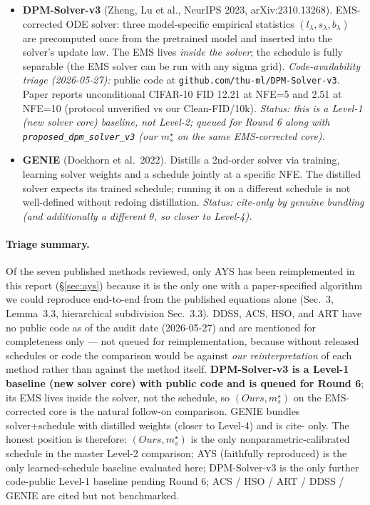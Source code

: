 \documentclass[11pt]{article}
\begin{document}
\begin{itemize}
  Timestep Schedule''). Adaptive Reparameterized Time + continuous-time
  RL with Gaussian policies; transfers from CIFAR-10 to FFHQ/AFHQv2/
  ImageNet without retraining. ``Within the official EDM pipeline''
  --- likely Heun-class--bound. \emph{Code-availability triage
  (2026-05-27):} no public GitHub released; arXiv'd 2026-01-26 (very
  recent). \emph{Status: no public code, mentioned for completeness.}
\item \textbf{DPM-Solver-v3} (Zheng, Lu et al., NeurIPS 2023,
  arXiv:2310.13268). EMS-corrected ODE solver: three model-specific
  empirical statistics \((l_\lambda, s_\lambda, b_\lambda)\) are
  precomputed once from the pretrained model and inserted into the
  solver's update law. The EMS lives \emph{inside the solver}; the
  schedule is fully separable (the EMS solver can be run with any
  sigma grid). \emph{Code-availability triage (2026-05-27):} public
  code at \texttt{github.com/thu-ml/DPM-Solver-v3}. Paper reports
  unconditional CIFAR-10 FID 12.21 at NFE=5 and 2.51 at NFE=10
  (protocol unverified vs our Clean-FID/10k). \emph{Status: this is
  a Level-1 (new solver core) baseline, not Level-2; queued for
  Round 6 along with \texttt{proposed\_dpm\_solver\_v3} (our
  \(m_s^\star\) on the same EMS-corrected core).}
\item \textbf{GENIE} (Dockhorn et al.\ 2022). Distills a 2nd-order
  solver via training, learning solver weights and a schedule jointly
  at a specific NFE. The distilled solver expects its trained schedule;
  running it on a different schedule is not well-defined without
  redoing distillation. \emph{Status: cite-only by genuine bundling
  (and additionally a different \(\theta\), so closer to Level-4).}
\end{itemize}

\paragraph{Triage summary.} Of the seven published methods reviewed,
only AYS has been reimplemented in this report (\S\ref{sec:ays})
because it is the only one with a paper-specified algorithm we could
reproduce end-to-end from the published equations alone (Sec.~3,
Lemma~3.3, hierarchical subdivision Sec.~3.3). DDSS, ACS, HSO, and ART
have no public code as of the audit date (2026-05-27) and are mentioned
for completeness only --- not queued for reimplementation, because
without released schedules or code the comparison would be against
\emph{our reinterpretation} of each method rather than against the
method itself. \textbf{DPM-Solver-v3 is a Level-1 baseline (new solver
core) with public code and is queued for Round 6}; its EMS lives inside
the solver, not the schedule, so \((Ours, m_s^\star)\) on the
EMS-corrected core is the natural follow-on comparison. GENIE bundles
solver+schedule with distilled weights (closer to Level-4) and is cite-
only. The honest position is therefore: \((Ours, m_s^\star)\) is the
only nonparametric-calibrated schedule in the master Level-2 comparison;
AYS (faithfully reproduced) is the only learned-schedule baseline
evaluated here; DPM-Solver-v3 is the only further code-public Level-1
baseline pending Round 6; ACS / HSO / ART / DDSS / GENIE are cited but
not benchmarked.
\end{document}
